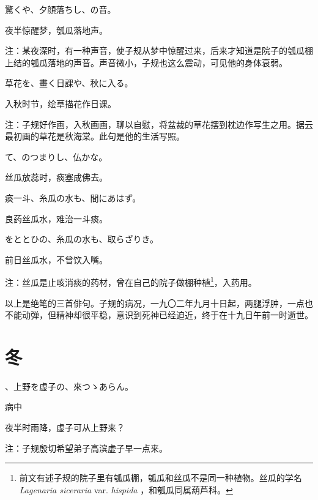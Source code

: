 \begin{haiku}
    {\FH 驚くや、夕顔落ちし、の音。}

    {\FK 夜半惊醒梦，瓠瓜落地声。}

    {\FT 注：某夜深时，有一种声音，使子规从梦中惊醒过来，后来才知道是院子的瓠瓜棚上结的瓠瓜落地的声音。声音微小，子规也这么震动，可见他的身体衰弱。}
\end{haiku}

\begin{haiku}
    {\FH 草花を、畫く日課や、秋に入る。}

    {\FK 入秋时节，绘草描花作日课。}

    {\FT 注：子规好作画，入秋画画，聊以自慰，将盆裁的草花摆到枕边作写生之用。据云最初画的草花是秋海棠。此句是他的生活写照。}
\end{haiku}

\begin{haiku}
    {\FH {}て、のつまりし、仏かな。}

    {\FK 丝瓜放蕊时，痰塞成佛去。}
\end{haiku}

\begin{haiku}
    {\FH 痰一斗、糸瓜の水も、間にあはず。}

    {\FK 良药丝瓜水，难治一斗痰。}
\end{haiku}

\begin{haiku}
    {\FH をととひの、糸瓜の水も、取らざりき。}

    {\FK 前日丝瓜水，不曾饮入嘴。}

    {\FT 注：丝瓜是止咳消痰的药材，曾在自己的院子做棚种植\footnote{{\FT 前文有述子规的院子里有瓠瓜棚，瓠瓜和丝瓜不是同一种植物。丝瓜的学名} \emph{Lagenaria siceraria} var. \emph{hispida} {\FT，和瓠瓜同属葫芦科。}}，入药用。}

    {\FT 以上是绝笔的三首俳句。子规的病况，一九〇二年九月十日起，两腿浮肿，一点也不能动弹，但精神却很平稳，意识到死神已经迫近，终于在十九日午前一时逝世。}
\end{haiku}

\section{\FK 冬}

\setcounter{haikucounter}{0}

\begin{haiku}
    {\FH {}、上野を虚子の、來つゝあらん。}

    {\FK 病中}

    {\FK 夜半时雨降，虚子可从上野来？}

    {\FT 注：子规殷切希望弟子高滨虚子早一点来。}
\end{haiku}

